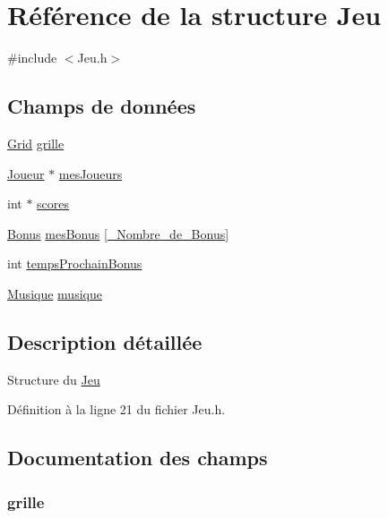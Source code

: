\hypertarget{struct_jeu}{\section{Référence de la structure Jeu}
\label{struct_jeu}
}


{\ttfamily \#include $<$Jeu.\-h$>$}

\subsection*{Champs de données}
\begin{DoxyCompactItemize}
\item 
\hyperlink{struct_grid}{Grid} \hyperlink{struct_jeu_a781153be5e9eae59fb7a8f62eb840b6d}{grille}
\item 
\hyperlink{struct_joueur}{Joueur} $\ast$ \hyperlink{struct_jeu_a632589b4fe33211e88d71bab5b8fecb1}{mes\-Joueurs}
\item 
int $\ast$ \hyperlink{struct_jeu_a859dd84beee150c7f6f6e683f1dc91ac}{scores}
\item 
\hyperlink{struct_bonus}{Bonus} \hyperlink{struct_jeu_a9ba9a1f879502d127ed00db670605ac7}{mes\-Bonus} \mbox{[}\hyperlink{_constantes_8h_af4e31715ab308023d6200e64b86b9946}{\-\_\-\-Nombre\-\_\-de\-\_\-\-Bonus}\mbox{]}
\item 
int \hyperlink{struct_jeu_a9691871ea592a3579dcc143a4730aa08}{temps\-Prochain\-Bonus}
\item 
\hyperlink{struct_musique}{Musique} \hyperlink{struct_jeu_aa0f1b7578210c2739aee880842d2fa27}{musique}
\end{DoxyCompactItemize}


\subsection{Description détaillée}
Structure du \hyperlink{struct_jeu}{Jeu} 

Définition à la ligne 21 du fichier Jeu.\-h.



\subsection{Documentation des champs}
\hypertarget{struct_jeu_a781153be5e9eae59fb7a8f62eb840b6d}{
\subsubsection[{grille}]{ grille}}\label{struct_jeu_a781153be5e9eae59fb7a8f62eb840b6d}



